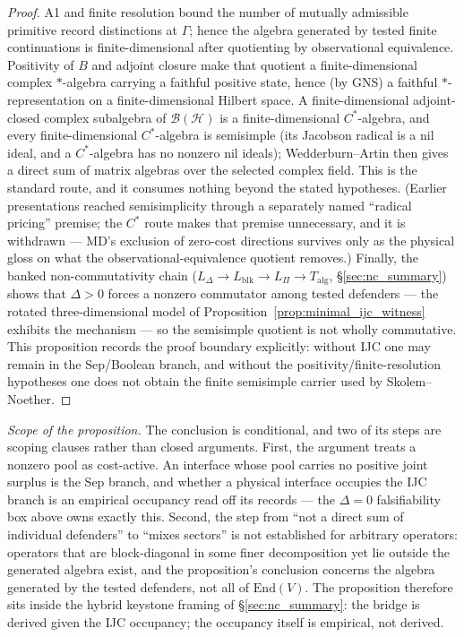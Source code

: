 \documentclass[11pt]{article}
\theoremstyle{definition}
\newcommand{\End}{\mathrm{End}}
\begin{document}
\begin{proof}
A1 and finite resolution bound the number of mutually admissible primitive record distinctions at $\Gamma$; hence the algebra generated by tested finite continuations is finite-dimensional after quotienting by observational equivalence.  Positivity of $B$ and adjoint closure make that quotient a finite-dimensional complex $*$-algebra carrying a faithful positive state, hence (by GNS) a faithful $*$-representation on a finite-dimensional Hilbert space.  A finite-dimensional adjoint-closed complex subalgebra of $\mathcal{B}(\mathcal{H})$ is a finite-dimensional $C^*$-algebra, and every finite-dimensional $C^*$-algebra is semisimple (its Jacobson radical is a nil ideal, and a $C^*$-algebra has no nonzero nil ideals); Wedderburn--Artin then gives a direct sum of matrix algebras over the selected complex field.  This is the standard route, and it consumes nothing beyond the stated hypotheses.  (Earlier presentations reached semisimplicity through a separately named ``radical pricing'' premise; the $C^*$ route makes that premise unnecessary, and it is withdrawn --- MD's exclusion of zero-cost directions survives only as the physical gloss on what the observational-equivalence quotient removes.)  Finally, the banked non-commutativity chain ($L_\Delta \to L_{\mathrm{blk}} \to L_\Pi \to T_{\mathrm{alg}}$, \S\ref{sec:nc_summary}) shows that $\Delta>0$ forces a nonzero commutator among tested defenders --- the rotated three-dimensional model of Proposition~\ref{prop:minimal_ijc_witness} exhibits the mechanism --- so the semisimple quotient is not wholly commutative.  This proposition records the proof boundary explicitly: without IJC one may remain in the Sep/Boolean branch, and without the positivity/finite-resolution hypotheses one does not obtain the finite semisimple carrier used by Skolem--Noether.
\end{proof}

\smallskip\noindent\textit{Scope of the proposition.}\quad
The conclusion is conditional, and two of its steps are scoping
clauses rather than closed arguments.  First, the argument treats a
nonzero pool as cost-active.  An interface whose pool carries no
positive joint surplus is the Sep branch, and whether a physical
interface occupies the IJC branch is an empirical occupancy read off
its records --- the $\Delta = 0$ falsifiability box above owns exactly
this.  Second, the step from ``not a direct sum of individual
defenders'' to ``mixes sectors'' is not established for arbitrary
operators: operators that are block-diagonal in some finer
decomposition yet lie outside the generated algebra exist, and the
proposition's conclusion concerns the algebra generated by the tested
defenders, not all of $\End(V)$.  The proposition therefore sits
inside the hybrid keystone framing of \S\ref{sec:nc_summary}: the
bridge is derived given the IJC occupancy; the occupancy itself is
empirical, not derived.
\end{document}
